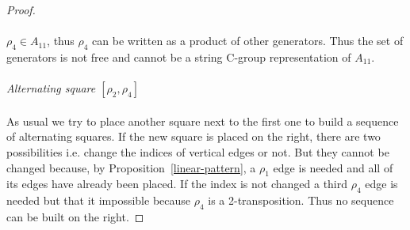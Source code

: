 \begin{proof}
\paragraph{}
$\rho_4 \in A_{11}$, thus $\rho_4$ can be written as a product of other generators. Thus the set of generators is not free and cannot be a string C-group representation of $A_{11}$.

\paragraph{}
\textit{Alternating square $[\rho_2,\rho_4]$}

\begin{figure}[H]
  \begin{center}
    \caption{}
  \end{center}
\end{figure}

\paragraph{}
As usual we try to place another square next to the first one to build a sequence of alternating squares. If the new square is placed on the right, there are two possibilities i.e. change the indices of vertical edges or not. But they cannot be changed because, by Proposition~\ref{linear-pattern}, a $\rho_1$ edge is needed and all of its edges have already been placed. If the index is not changed a third $\rho_4$ edge is needed but that it impossible because $\rho_4$ is a 2-transposition. Thus no sequence can be built on the right.


\end{proof}
